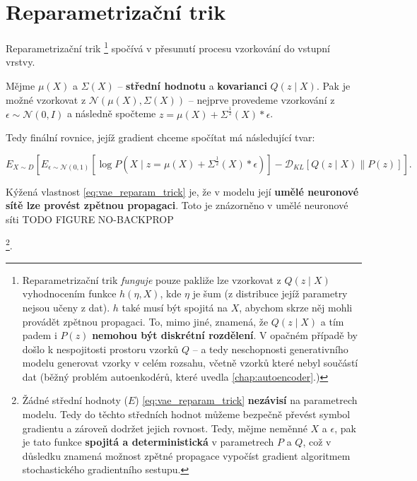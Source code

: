 \section{Reparametrizační trik}
\label{sec:reparametrization_trick}
Reparametrizační trik
\footnote{Reparametrizační trik \emph{funguje} pouze pakliže lze vzorkovat z $Q(z\mid X)$ vyhodnocením funkce $h(\eta, X)$, kde $\eta$ je šum (z distribuce jejíž parametry nejsou učeny z dat). $h$ také musí být spojitá na $X$, abychom skrze něj mohli provádět zpětnou propagaci.
To, mimo jiné, znamená, že $Q(z\mid X)$ a tím padem i $P(z)$ \textbf{nemohou být diskrétní rozdělení}. V opačném případě by došlo k nespojitosti prostoru vzorků $Q$ – a tedy neschopnosti generativního modelu generovat vzorky v celém rozsahu, včetně vzorků které nebyl součástí dat (běžný problém autoenkodérů, které uvedla \autoref{chap:autoencoder}.)}
spočívá v přesunutí procesu vzorkování do vstupní vrstvy.

Mějme $\mu(X)$ a $\Sigma(X)$ – \textbf{střední hodnotu} a \textbf{kovarianci} $Q(z\mid X)$.
Pak je možné vzorkovat z $\mathcal{N}(\mu(X), \Sigma(X))$ – nejprve provedeme vzorkování z $\epsilon \sim \mathcal{N}(0, I)$ a následně spočteme $z = \mu(X) + \Sigma^{\frac{1}{2}}(X) * \epsilon$.

Tedy finální rovnice, jejíž gradient chceme spočítat má následující tvar:

\begin{equation} \label{eq:vae_reparam_trick}
    E_{X \sim D} \left[ E_{\epsilon \sim \mathcal{N}(0, 1)} \left[ \log P(X\mid z = \mu(X) + \Sigma^{\frac{1}{2}} (X) * \epsilon) \right] - \mathcal{D}_{KL} \left[ Q (z \mid X) \parallel P(z) \right] \right].
\end{equation}

Kýžená vlastnost \autoref{eq:vae_reparam_trick} je, že v modelu její \textbf{umělé neuronové sítě lze provést zpětnou propagaci}. 
Toto je znázorněno v umělé neuronové síti TODO FIGURE NO-BACKPROP 

\footnote{Žádné střední hodnoty ($E$) \autoref{eq:vae_reparam_trick} \textbf{nezávisí} na parametrech modelu. Tedy do těchto středních hodnot můžeme bezpečně převést symbol gradientu a zároveň dodržet jejich rovnost. 
Tedy, mějme neměnné $X$ a $\epsilon$, pak je tato funkce \textbf{spojitá a deterministická} v parametrech $P$ a $Q$, což v důsledku znamená možnost zpětné propagace vypočíst gradient algoritmem stochastického gradientního sestupu. }. 

